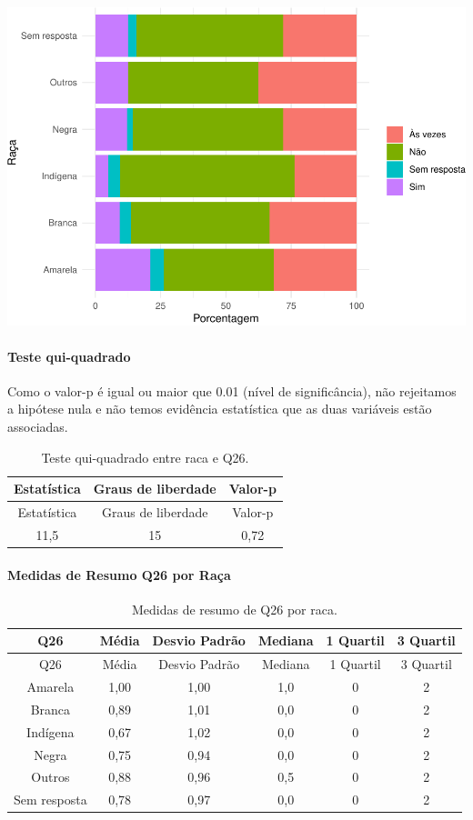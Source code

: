 \documentclass[]{article}
\let\oldparagraph\paragraph
\renewcommand{\paragraph}[1]{\oldparagraph{#1}\mbox{}}
\begin{document}
\begin{center}\includegraphics[width=0.75\linewidth]{relatorio_covid19_files/figure-latex/unnamed-chunk-752-1} \end{center}

\hypertarget{teste-qui-quadrado-65}{%
\paragraph{Teste qui-quadrado}\label{teste-qui-quadrado-65}}

Como o valor-p é igual ou maior que 0.01 (nível de significância), não rejeitamos a hipótese nula e não temos evidência estatística que as duas variáveis estão associadas.

\begin{longtable}[]{@{}ccc@{}}
\caption{\label{tab:unnamed-chunk-754}Teste qui-quadrado entre raca e Q26.}\tabularnewline
\toprule
Estatística & Graus de liberdade & Valor-p\tabularnewline
\midrule
\endfirsthead
\toprule
Estatística & Graus de liberdade & Valor-p\tabularnewline
\midrule
\endhead
11,5 & 15 & 0,72\tabularnewline
\bottomrule
\end{longtable}

\cleardoublepage

\hypertarget{medidas-de-resumo-q26-por-rauxe7a}{%
\paragraph{Medidas de Resumo Q26 por Raça}\label{medidas-de-resumo-q26-por-rauxe7a}}

\begin{longtable}[]{@{}cccccc@{}}
\caption{\label{tab:unnamed-chunk-755}Medidas de resumo de Q26 por raca.}\tabularnewline
\toprule
Q26 & Média & Desvio Padrão & Mediana & 1 Quartil & 3 Quartil\tabularnewline
\midrule
\endfirsthead
\toprule
Q26 & Média & Desvio Padrão & Mediana & 1 Quartil & 3 Quartil\tabularnewline
\midrule
\endhead
Amarela & 1,00 & 1,00 & 1,0 & 0 & 2\tabularnewline
Branca & 0,89 & 1,01 & 0,0 & 0 & 2\tabularnewline
Indígena & 0,67 & 1,02 & 0,0 & 0 & 2\tabularnewline
Negra & 0,75 & 0,94 & 0,0 & 0 & 2\tabularnewline
Outros & 0,88 & 0,96 & 0,5 & 0 & 2\tabularnewline
Sem resposta & 0,78 & 0,97 & 0,0 & 0 & 2\tabularnewline
\bottomrule
\end{longtable}
\end{document}
